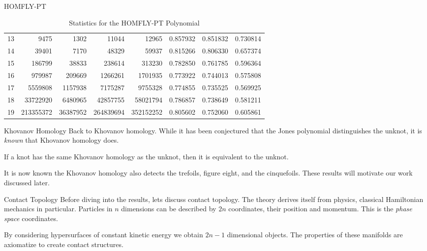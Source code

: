\documentclass{beamer}
\begin{document}
\begin{frame}{HOMFLY-PT}
\begin{table}
{\begin{tabular}{| r | r | r | r | r | r | r | r |}
                    13 &      9475 &     1302 &     11044 &     12965 & 0.857932 & 0.851832 & 0.730814\\
                    14 &     39401 &     7170 &     48329 &     59937 & 0.815266 & 0.806330 & 0.657374\\
                    15 &    186799 &    38833 &    238614 &    313230 & 0.782850 & 0.761785 & 0.596364\\
                    16 &    979987 &   209669 &   1266261 &   1701935 & 0.773922 & 0.744013 & 0.575808\\
                    17 &   5559808 &  1157938 &   7175287 &   9755328 & 0.774855 & 0.735525 & 0.569925\\
                    18 &  33722920 &  6480965 &  42857755 &  58021794 & 0.786857 & 0.738649 & 0.581211\\
                    19 & 213355372 & 36387952 & 264839694 & 352152252 & 0.805602 & 0.752060 & 0.605861\\
                    \hline
                \end{tabular}
            }
            \caption{Statistics for the HOMFLY-PT Polynomial}
        \end{table}
    \end{frame}
    \begin{frame}{Khovanov Homology}
        Back to Khovanov homology. While it has been conjectured that the
        Jones polynomial distinguishes the unknot, it is \textit{known} that
        Khovanov homology does.
        \begin{theorem}
            If a knot has the same Khovanov homology as the unknot, then it
            is equivalent to the unknot.
        \end{theorem}
        It is now known the Khovanov homology also detects the trefoils,
        figure eight, and the cinquefoils. These results will motivate our
        work discussed later.
    \end{frame}
    \begin{frame}{Contact Topology}
        Before diving into the results, lets discuss contact topology. The
        theory derives itself from physics, classical Hamiltonian mechanics
        in particular. Particles in $n$ dimensions can be described by
        $2n$ coordinates, their position and momentum. This is the
        \textit{phase space} coordinates.
        \par\hfill\par
        By considering hypersurfaces of constant kinetic energy we obtain
        $2n-1$ dimensional objects. The properties of these manifolds are
        axiomatize to create contact structures.
    \end{frame}
\end{document}
